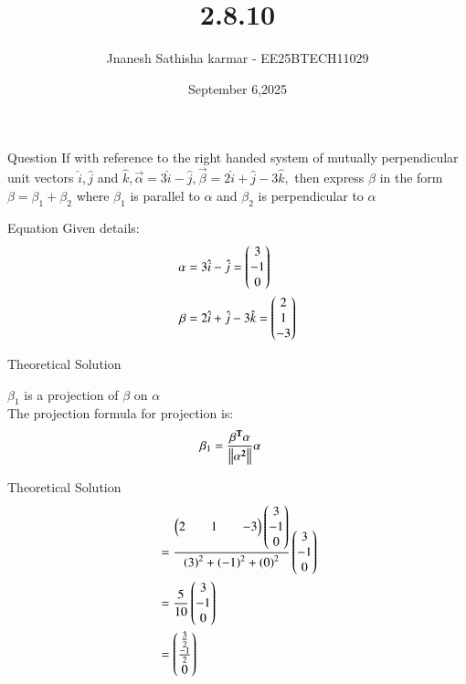 \documentclass{beamer}
\title %
{2.8.10}
\date{September 6,2025}
\author 
{Jnanesh Sathisha karmar - EE25BTECH11029}
\begin{document}
\frame{\titlepage}
\begin{frame}{Question}
If with reference to the right handed system of mutually perpendicular unit vectors
$\hat{i},\hat{j}$ and $\hat{k}, \vec{\alpha} = 3\hat{i}-\hat{j},\vec{\beta} = 2\hat{i} +\hat{j} - 3\hat{k},$ then express $\beta$ in the form $\beta =\beta_1 +\beta_2$ where $\beta_1$ is parallel to $\alpha$ and $\beta_2$ is perpendicular to $\alpha$
\end{frame}



\begin{frame}{Equation}
Given details:
\begin{align}
    \mathbf{\alpha} &= 3\hat{i}-\hat{j}=\begin{pmatrix}3 \\ -1\\0\end{pmatrix}\\\mathbf{\beta} &= 2\hat{i} +\hat{j} - 3\hat{k}=\begin{pmatrix}2\\1\\-3\end{pmatrix}
\end{align}
\end{frame}
\begin{frame}{Theoretical Solution}

$\beta_1$ is a projection of $\beta$ on $\alpha$\\
The projection formula for projection is: 
\begin{align}
\beta_1&=\frac{\mathbf{\beta^T}\mathbf{\alpha}}{\left\lVert\mathbf{\alpha^2}\right\rVert}\mathbf{\alpha}
\end{align}
\end{frame}

\begin{frame}{Theoretical Solution}
\begin{align}
&=\frac{\begin{pmatrix}2&&1&&-3\end{pmatrix}\begin{pmatrix}3\\-1\\0\end{pmatrix}}{\left(3\right)^2+\left(-1\right)^2+\left(0\right)^2}\begin{pmatrix}3\\-1\\0\end{pmatrix}\\
&=\frac{5}{10}\begin{pmatrix}3\\-1\\0\end{pmatrix}\\
&=\begin{pmatrix}\frac{3}{2}\\ \frac{-1}{2}\\ 0\end{pmatrix}
\end{align}
\end{frame}
\end{document}
